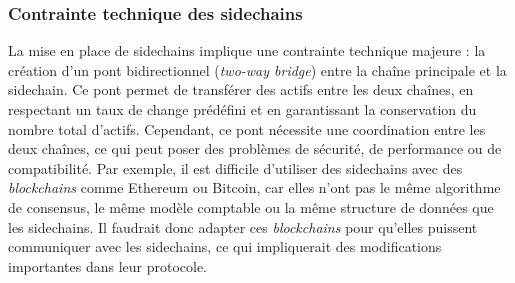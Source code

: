 \subsubsection{Contrainte technique des sidechains}
La mise en place de \gls{sidechain}s implique une contrainte technique majeure : la création d'un pont bidirectionnel (\textit{two-way bridge}) entre la chaîne 
principale et la \gls{sidechain}. Ce pont permet de transférer des \gls{actif}s entre les deux chaînes, en respectant un taux de change prédéfini et en garantissant la 
conservation du nombre total d'\gls{actif}s. Cependant, ce pont nécessite une coordination entre les deux chaînes, ce qui peut poser des problèmes de sécurité, de 
performance ou de compatibilité. Par exemple, il est difficile d'utiliser des \gls{sidechain}s avec des \textit{\gls{blockchain}s} comme \gls{Ethereum} ou \gls{Bitcoin}, car elles n'ont 
pas le même algorithme de consensus, le même modèle comptable ou la même structure de données que les \gls{sidechain}s. Il faudrait donc adapter ces \textit{\gls{blockchain}s} 
pour qu'elles puissent communiquer avec les \gls{sidechain}s, ce qui impliquerait des modifications importantes dans leur protocole.
